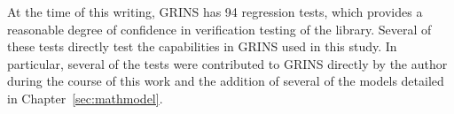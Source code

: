 
At the time of this writing, GRINS has 94 regression tests, which
provides a reasonable degree of confidence in verification testing of
the library. Several of these tests directly test the capabilities in
GRINS used in this study. In particular, several of the tests were
contributed to GRINS directly by the author during the course of this
work and the addition of several of the models detailed in
Chapter~\ref{sec:mathmodel}. 


